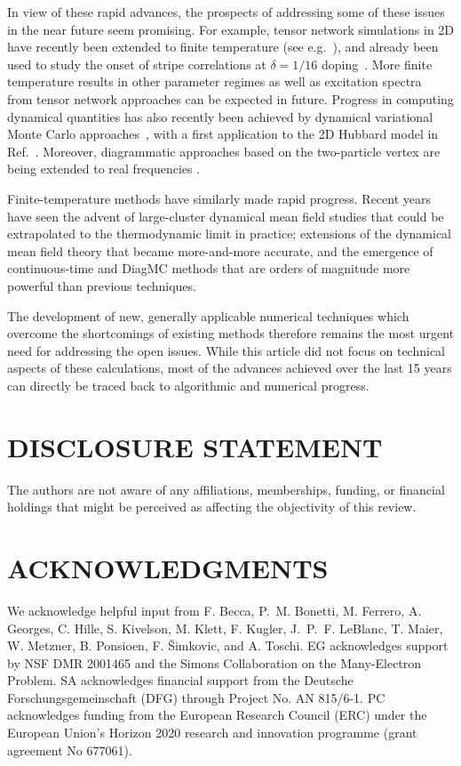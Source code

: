 \documentclass{ar-1col}
\begin{document}
In view of these rapid advances, the prospects of addressing some of these issues in the near future seem promising. For example, tensor network simulations in 2D have recently been extended to finite temperature (see e.g.~\cite{Wietek20,Czarnik19,Chen21}), and already  been used to study the onset of stripe correlations at $\delta=1/16$ doping~\cite{Wietek20}. More finite temperature results in other parameter regimes as well as excitation spectra~\cite{Bohrdt20,Vanderstraeten19,Ponsioen20,Damme21} from tensor network approaches can be expected in future. Progress in computing dynamical quantities has also recently been achieved by dynamical variational Monte Carlo approaches~\cite{Ferrari19,Charlebois20}, with a first application to the 2D Hubbard model in Ref.~\cite{Charlebois20}. Moreover, diagrammatic approaches based on the two-particle vertex are being extended to real frequencies \cite{Kugler21}.

Finite-temperature methods have similarly made rapid progress. Recent years have seen the advent of large-cluster dynamical mean field studies that could be extrapolated to the thermodynamic limit in practice; extensions of the dynamical mean field theory that became more-and-more accurate, and the emergence of continuous-time and DiagMC methods that are orders of magnitude more powerful than previous techniques. 

The development of new, generally applicable numerical techniques which overcome the shortcomings of existing methods therefore remains the most urgent need for addressing the open issues. While this article did not focus on technical aspects of these calculations, most of the advances achieved over the last 15 years can directly be traced back to algorithmic and numerical progress.

\section*{DISCLOSURE STATEMENT}
The authors are not aware of any affiliations, memberships, funding, or financial holdings that
might be perceived as affecting the objectivity of this review. 

\section*{ACKNOWLEDGMENTS}
We acknowledge helpful input from F. Becca, P.~M. Bonetti, M. Ferrero, A. Georges, C. Hille, S. Kivelson, M. Klett, F. Kugler, J.~P.~F. LeBlanc, T. Maier, W. Metzner, B. Ponsioen, F. {\v S}imkovic, and A. Toschi. EG acknowledges support by NSF DMR 2001465 and the Simons Collaboration on the Many-Electron Problem. SA acknowledges financial support from the Deutsche Forschungsgemeinschaft (DFG) through Project No. AN 815/6-1. PC acknowledges funding from the European Research Council (ERC) under the European Union's Horizon 2020 research and innovation programme (grant agreement No 677061). 
%


\end{document}

